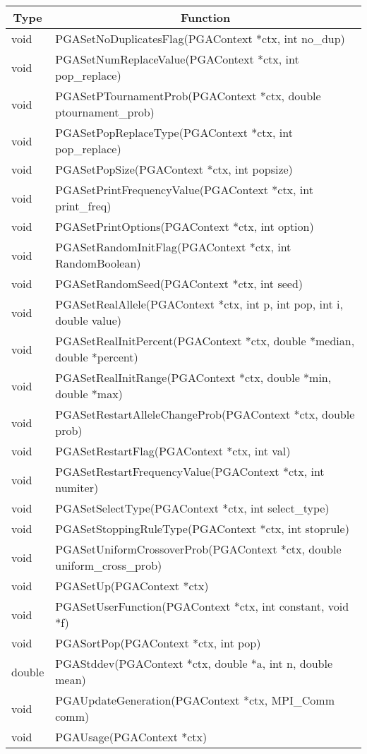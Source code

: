 \documentclass{report}
\begin{document}
\begin{tabular}{|l|l|} \hline\hline
\multicolumn{1}{|c|}{Type} &
\multicolumn{1}{c|}{Function}  \\  \hline\hline
void &  PGASetNoDuplicatesFlag(PGAContext *ctx, int no\_dup) \\ \hline
void &  PGASetNumReplaceValue(PGAContext *ctx, int pop\_replace) \\ \hline
void &  PGASetPTournamentProb(PGAContext *ctx, double ptournament\_prob) \\ \hline
void &  PGASetPopReplaceType(PGAContext *ctx, int pop\_replace) \\ \hline
void &  PGASetPopSize(PGAContext *ctx, int popsize) \\ \hline
void &  PGASetPrintFrequencyValue(PGAContext *ctx, int print\_freq) \\ \hline
void &  PGASetPrintOptions(PGAContext *ctx, int option) \\ \hline
void &  PGASetRandomInitFlag(PGAContext *ctx, int RandomBoolean) \\ \hline
void &  PGASetRandomSeed(PGAContext *ctx, int seed) \\ \hline
void &  PGASetRealAllele(PGAContext *ctx, int p, int pop, int i, double value)
\\ \hline
void &  PGASetRealInitPercent(PGAContext *ctx, double *median, double
*percent) \\ \hline
void &  PGASetRealInitRange(PGAContext *ctx, double *min, double *max) \\ \hline
void &  PGASetRestartAlleleChangeProb(PGAContext *ctx, double prob) \\ \hline
void &  PGASetRestartFlag(PGAContext *ctx, int val) \\ \hline
void &  PGASetRestartFrequencyValue(PGAContext *ctx, int numiter) \\ \hline
void &  PGASetSelectType(PGAContext *ctx, int select\_type) \\ \hline
void &  PGASetStoppingRuleType(PGAContext *ctx, int stoprule) \\ \hline
void &  PGASetUniformCrossoverProb(PGAContext *ctx, double uniform\_cross\_prob)
\\ \hline
void &  PGASetUp(PGAContext *ctx) \\ \hline
void &  PGASetUserFunction(PGAContext *ctx, int constant, void *f) \\ \hline
void &  PGASortPop(PGAContext *ctx, int pop) \\ \hline
double &  PGAStddev(PGAContext *ctx, double *a, int n, double mean) \\ \hline
void &  PGAUpdateGeneration(PGAContext *ctx, MPI\_Comm comm) \\ \hline
void &  PGAUsage(PGAContext *ctx) \\ \hline
\end{tabular}
\end{document}
